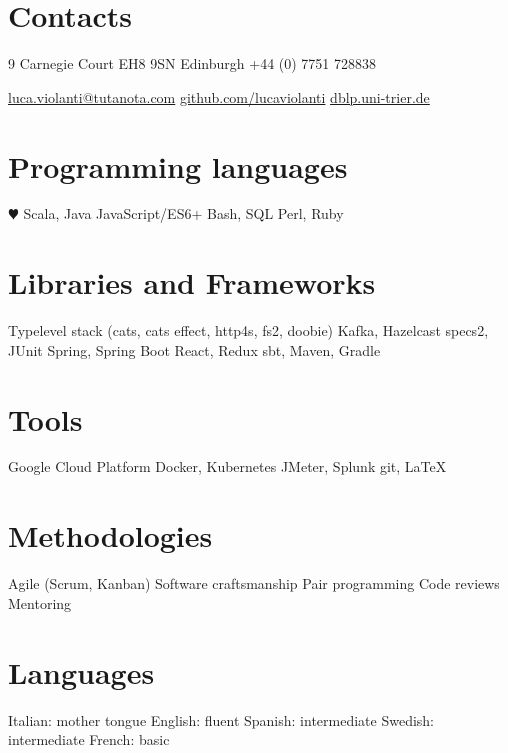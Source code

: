 \documentclass[nocolors]{curriculum-vitae}
\begin{document}

    \begin{aside}
        \section{Contacts}
            9 Carnegie Court
            EH8 9SN Edinburgh
            +44 (0) 7751 728838
            \begin{footnotesize}\href{mailto:luca.violanti@tutanota.com}{luca.violanti@tutanota.com}
                \href{http://github.com/lucaviolanti}{github.com/lucaviolanti}
                \href{https://dblp.uni-trier.de/pid/163/5157.html}{dblp.uni-trier.de}\end{footnotesize}
        \section{Programming languages}
            $\varheartsuit$ Scala, Java
            JavaScript/ES6+
            Bash, SQL
            Perl, Ruby
        \section{Libraries and Frameworks}
            Typelevel stack
            (cats, cats effect,
            http4s, fs2, doobie)
            Kafka, Hazelcast
            specs2, JUnit
            Spring, Spring Boot
            React, Redux
            sbt, Maven, Gradle
        \section{Tools}
            Google Cloud Platform
            Docker, Kubernetes
            JMeter, Splunk
            git, \LaTeX
        \section{Methodologies}
            Agile (Scrum, Kanban)
            Software craftsmanship
            Pair programming
            Code reviews
            Mentoring
        \section{Languages}
            Italian: mother tongue
            English: fluent
            Spanish: intermediate
            Swedish: intermediate
            French: basic
    \end{aside}
\end{document}
